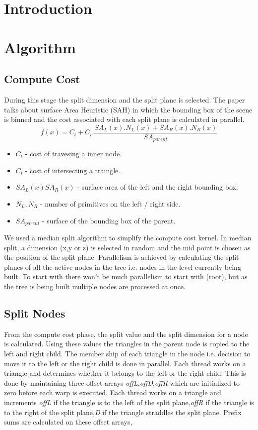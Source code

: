 \documentclass[11pt]{article}
\begin{document}
\maketitle
\section{Introduction}
\section{Algorithm}
\subsection*{Compute Cost}
During this stage the split dimension and the split plane is selected. The paper talks about surface Area Heuristic (SAH) in which the bounding box of the scene is binned and the cost associated with each split plane is calculated in parallel.
\[ f(x) = C_t + C_i. \frac{SA_L(x).N_L(x) + SA_R(x).N_R(x)}{SA_{parent}} \]
\begin{itemize}
\item $C_t$ - cost of travesing a inner node.
\item $C_i$ - cost of intersecting a traingle. 
\item $SA_L(x) SA_R(x)$ - surface area of the left and the right bounding box.
\item $N_L, N_R$ - number of primitives on the left / right side.
\item $SA_{parent}$ - surface of the bounding box of the parent.
\end{itemize}
We used a median split algorithm to simplify the compute cost kernel. In median split, a dimension (x,y or z) is selected in random and the mid point is chosen as the position of the split plane. Parallelism is achieved by calculating the split planes of all the active nodes in the tree i.e. nodes in the level currently being built.
To start with there won't be much parallelism to start with (root), but as the tree is being built multiple nodes are processed at once.
\subsection*{Split Nodes}
From the compute cost phase, the split value and the split dimension for a node is calculated. Using these values the triangles in the parent node is copied to the left and right child. The member ship of each triangle in the node i.e. decision to move it to the left or the right child is done in parallel. Each thread works on a triangle and determines whether it belongs to the left or the right child. This is done by maintaining three offset arrays \textit{offL},\textit{offD},\textit{offR} which are initialized to zero before each warp is executed. Each thread works on a triangle and increments \textit{offL} if the triangle is to the left of the split plane,\textit{offR} if the triangle is to the right of the split plane,\textit{D} if the triangle straddles the split plane. Prefix sums are calculated on these offset arrays,
\end{document}
